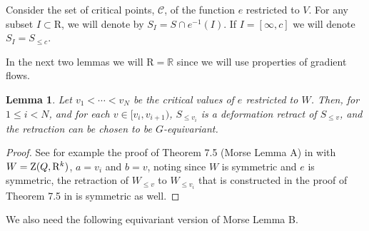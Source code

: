 \documentclass{amsart}
\newtheorem{lemma}{Lemma}
\theoremstyle{definition}
\theoremstyle{remark}
\numberwithin{equation}{section}
\begin{document}
Consider the set of critical points, $\mathcal{C}$, of the function $e$ restricted to $V$. 
For any subset $I \subset {\mathrm{R}}$, we will denote by $S_I = S \cap e^{-1}(I)$. 
If $I = [\infty,c]$ we will denote $S_I = S_{\leq c}$.

In the next two lemmas we will  ${\mathrm{R}} = \mathbb{R}$ since we will use properties of gradient flows.
\begin{lemma}
  \label{lem:equivariant_morseA} 
  Let $v_1<\cdots < v_N$ be the critical values of $e$ restricted to $W$.
  Then, for $1 \leq i<N$, and for each $v \in
  [ v_{i} ,v_{i+1})$, $S_{\leq v_{i}}$ is a deformation retract of $S_{\leq v}$, and the retraction
  can be chosen to be $G$-equivariant.
\end{lemma}
\begin{proof}
See for example the proof of Theorem 7.5 (Morse Lemma A) in \cite{BPRbook2} with 
$W = {{\rm Z}}(Q,{\mathrm{R}}^k)$, $a=v_{i}$ and $b=v$, noting since $W$ is symmetric and $e$ is symmetric,  the retraction of $W_{\leq v}$ to $W_{\leq v_i}$ that is constructed in the proof of
Theorem 7.5 in \cite{BPRbook2} is symmetric as well. 
\end{proof}
We also need the following equivariant version of Morse Lemma B.
\end{document}
